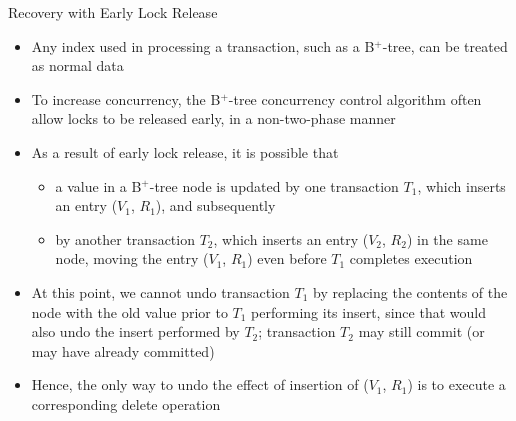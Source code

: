 \documentclass[aspectratio=169, xcolor=dvipsnames]{beamer}
\begin{document}
\begin{frame}{Recovery with Early Lock Release}
    \begin{itemize}[<+->]
        \item Any index used in processing a transaction, such as a B$^+$-tree, can be treated as normal data
        \item To increase concurrency, the B$^+$-tree concurrency control algorithm often allow locks to be released early, in a non-two-phase manner
        \item As a result of early lock release, it is possible that
        \begin{itemize}
            \item[$\triangleright$] a value in a B$^+$-tree node is updated by one transaction $T_1$, which inserts an entry ($V_1$, $R_1$), and subsequently
            \item[$\triangleright$] by another transaction $T_2$, which inserts an entry ($V_2$, $R_2$) in the same node, moving the entry ($V_1$, $R_1$) even before $T_1$ completes execution
        \end{itemize}
        \item At this point, we cannot undo transaction $T_1$ by replacing the contents of the node with the old value prior to $T_1$ performing its insert, since that would also undo the insert performed by $T_2$; transaction $T_2$ may still commit (or may have already committed)
        \item Hence, the only way to undo the effect of insertion of ($V_1$, $R_1$) is to execute a corresponding delete operation
    \end{itemize}
\end{frame}
\end{document}
